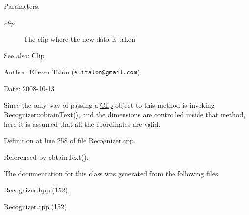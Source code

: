 \begin{Desc}
\item[Parameters:]
\begin{description}
\item[{\em clip}]The clip where the new data is taken\end{description}
\end{Desc}
\begin{Desc}
\item[See also:]\hyperlink{class_clip}{Clip}\end{Desc}
\begin{Desc}
\item[Author:]Eliezer Talón (\href{mailto:elitalon@gmail.com}{\tt elitalon@gmail.com}) \end{Desc}
\begin{Desc}
\item[Date:]2008-10-13\end{Desc}
Since the only way of passing a \hyperlink{class_clip}{Clip} object to this method is invoking \hyperlink{class_recognizer_008a0ea69a912ff54882dd20d18adcf9}{Recognizer::obtainText()}, and the dimensions are controlled inside that method, here it is assumed that all the coordinates are valid. 

Definition at line 258 of file Recognizer.cpp.

Referenced by obtainText().

The documentation for this class was generated from the following files:\begin{CompactItemize}
\item 
\hyperlink{_recognizer_8hpp}{Recognizer.hpp (152)}\item 
\hyperlink{_recognizer_8cpp}{Recognizer.cpp (152)}\end{CompactItemize}
